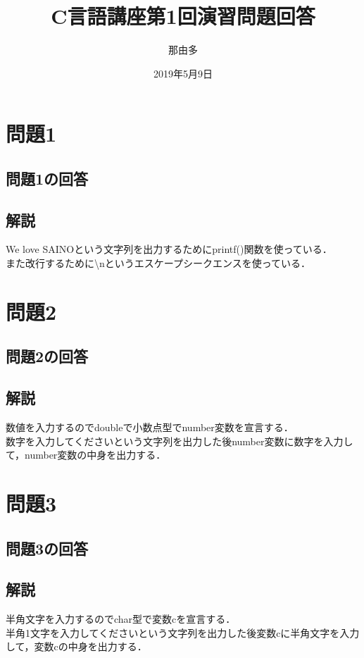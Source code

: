 \documentclass[a4j,titlepage,dvipdfmx]{jsarticle}   %
\title{C言語講座第1回演習問題回答}
\author{那由多}
\date{2019年5月9日}
\newcommand{\codepath}{./code}
\begin{document}
\maketitle
\section{問題1}
\subsection{問題1の回答}

\subsection{解説}
We love SAINOという文字列を出力するためにprintf()関数を使っている．\\
また改行するために\textbackslash nというエスケープシークエンスを使っている．\\

\section{問題2}
\subsection{問題2の回答}

\subsection{解説}
数値を入力するのでdoubleで小数点型でnumber変数を宣言する．\\
数字を入力してくださいという文字列を出力した後number変数に数字を入力して，number変数の中身を出力する．\\

\section{問題3}
\subsection{問題3の回答}

\subsection{解説}
半角文字を入力するのでchar型で変数cを宣言する．\\
半角1文字を入力してくださいという文字列を出力した後変数cに半角文字を入力して，変数cの中身を出力する．\\
\end{document}
